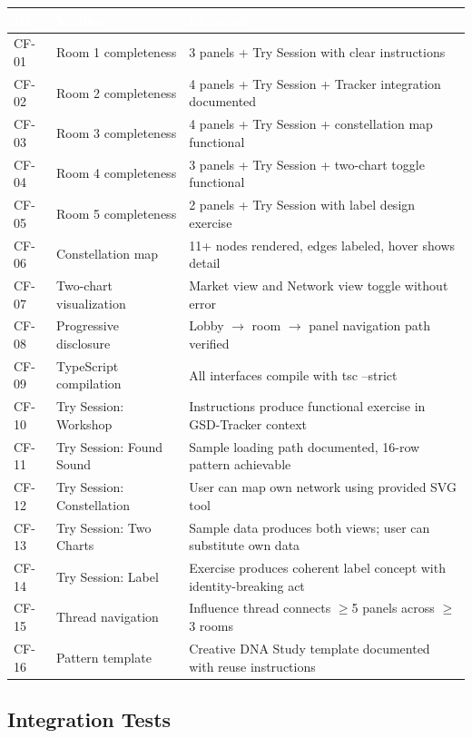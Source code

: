\documentclass[11pt,letterpaper]{article}
\newcommand{\tableheader}[1]{\textbf{\sffamily\textcolor{white}{#1}}}
\begin{document}
\begin{center}
\begin{tabularx}{\textwidth}{C{1.2cm}L{3.5cm}X}
\toprule
{}
\tableheader{ID} & \tableheader{Verifies} & \tableheader{Expected} \\
\midrule
CF-01 & Room 1 completeness & 3 panels + Try Session with clear instructions \\
CF-02 & Room 2 completeness & 4 panels + Try Session + Tracker integration documented \\
CF-03 & Room 3 completeness & 4 panels + Try Session + constellation map functional \\
CF-04 & Room 4 completeness & 3 panels + Try Session + two-chart toggle functional \\
CF-05 & Room 5 completeness & 2 panels + Try Session with label design exercise \\
CF-06 & Constellation map & 11+ nodes rendered, edges labeled, hover shows detail \\
CF-07 & Two-chart visualization & Market view and Network view toggle without error \\
CF-08 & Progressive disclosure & Lobby $\rightarrow$ room $\rightarrow$ panel navigation path verified \\
CF-09 & TypeScript compilation & All interfaces compile with tsc --strict \\
CF-10 & Try Session: Workshop & Instructions produce functional exercise in GSD-Tracker context \\
CF-11 & Try Session: Found Sound & Sample loading path documented, 16-row pattern achievable \\
CF-12 & Try Session: Constellation & User can map own network using provided SVG tool \\
CF-13 & Try Session: Two Charts & Sample data produces both views; user can substitute own data \\
CF-14 & Try Session: Label & Exercise produces coherent label concept with identity-breaking act \\
CF-15 & Thread navigation & Influence thread connects $\geq$5 panels across $\geq$3 rooms \\
CF-16 & Pattern template & Creative DNA Study template documented with reuse instructions \\
\bottomrule
\end{tabularx}
\end{center}

\subsection{Integration Tests}
\end{document}
